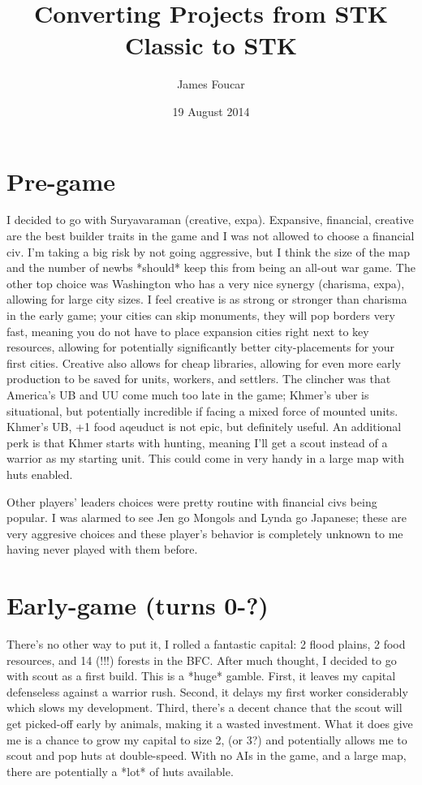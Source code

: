 \documentclass[10pt]{article}
\title{Converting Projects from STK Classic to STK}
\author{James Foucar}
\date{19 August 2014}
\begin{document}
\section*{Pre-game}

I decided to go with Suryavaraman (creative, expa). Expansive,
financial, creative are the best builder traits in the game and I was
not allowed to choose a financial civ. I'm taking a big risk by not
going aggressive, but I think the size of the map and the number of
newbs *should* keep this from being an all-out war game. The other top
choice was Washington who has a very nice synergy (charisma, expa),
allowing for large city sizes. I feel creative is as strong or
stronger than charisma in the early game; your cities can skip
monuments, they will pop borders very fast, meaning you do not have to
place expansion cities right next to key resources, allowing for
potentially significantly better city-placements for your first
cities. Creative also allows for cheap libraries, allowing for even
more early production to be saved for units, workers, and
settlers. The clincher was that America's UB and UU come much too late
in the game; Khmer's uber is situational, but potentially incredible
if facing a mixed force of mounted units. Khmer's UB, +1 food aqeuduct
is not epic, but definitely useful. An additional perk is that Khmer
starts with hunting, meaning I'll get a scout instead of a warrior as
my starting unit. This could come in very handy in a large map with
huts enabled.

Other players' leaders choices were pretty routine with financial civs
being popular. I was alarmed to see Jen go Mongols and Lynda go
Japanese; these are very aggresive choices and these player's behavior
is completely unknown to me having never played with them before.

\section*{Early-game (turns 0-?)}

There's no other way to put it, I rolled a fantastic capital: 2 flood
plains, 2 food resources, and 14 (!!!) forests in the BFC. After much
thought, I decided to go with scout as a first build. This is a *huge*
gamble. First, it leaves my capital defenseless against a warrior
rush. Second, it delays my first worker considerably which slows my
development. Third, there's a decent chance that the scout will get
picked-off early by animals, making it a wasted investment. What it
does give me is a chance to grow my capital to size 2, (or 3?) and
potentially allows me to scout and pop huts at double-speed. With no
AIs in the game, and a large map, there are potentially a *lot* of
huts available.
\end{document}

